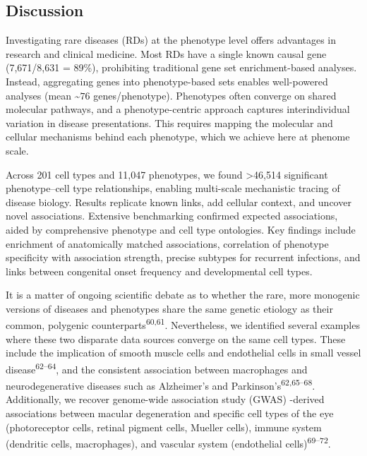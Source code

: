 \documentclass[
]{article}
\begin{document}
\subsection{Discussion}\label{sec-discussion}

Investigating rare diseases (RDs) at the phenotype level offers
advantages in research and clinical medicine. Most RDs have a single
known causal gene (7,671/8,631 = 89\%), prohibiting traditional gene set
enrichment-based analyses. Instead, aggregating genes into
phenotype-based sets enables well-powered analyses (mean
\textasciitilde{}\(76\) genes/phenotype). Phenotypes often converge on
shared molecular pathways, and a phenotype-centric approach captures
interindividual variation in disease presentations. This requires
mapping the molecular and cellular mechanisms behind each phenotype,
which we achieve here at phenome scale.

Across 201 cell types and 11,047 phenotypes, we found \textgreater46,514
significant phenotype--cell type relationships, enabling multi-scale
mechanistic tracing of disease biology. Results replicate known links,
add cellular context, and uncover novel associations. Extensive
benchmarking confirmed expected associations, aided by comprehensive
phenotype and cell type ontologies. Key findings include enrichment of
anatomically matched associations, correlation of phenotype specificity
with association strength, precise subtypes for recurrent infections,
and links between congenital onset frequency and developmental cell
types.

It is a matter of ongoing scientific debate as to whether the rare, more
monogenic versions of diseases and phenotypes share the same genetic
etiology as their common, polygenic counterparts\textsuperscript{60,61}.
Nevertheless, we identified several examples where these two disparate
data sources converge on the same cell types. These include the
implication of smooth muscle cells and endothelial cells in small vessel
disease\textsuperscript{62--64}, and the consistent association between
macrophages and neurodegenerative diseases such as Alzheimer's and
Parkinson's\textsuperscript{62,65--68}. Additionally, we recover
genome-wide association study (GWAS) -derived associations between
macular degeneration and specific cell types of the eye (photoreceptor
cells, retinal pigment cells, Mueller cells), immune system (dendritic
cells, macrophages), and vascular system (endothelial
cells)\textsuperscript{69--72}.
\end{document}
